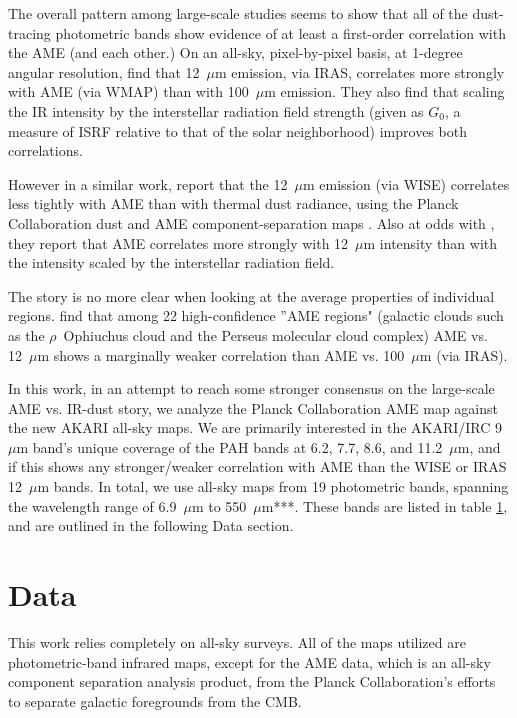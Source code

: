 \documentclass[preprint2,longabstract]{aastex}
\begin{document}
    The overall pattern among large-scale studies seems to show that all of the dust-tracing photometric bands show evidence of at least a first-order correlation with the AME (and each other.) On an all-sky, pixel-by-pixel basis, at 1-degree angular resolution, \cite{ysard10b} find that 12~$\mu$m emission, via IRAS, correlates more strongly with AME (via WMAP) than with 100~$\mu$m emission. They also find that scaling the IR intensity by the interstellar radiation field strength (given as $G_0$, a measure of ISRF relative to that of the solar neighborhood) improves both correlations.
    
    However in a similar work, \cite{hensley16} report that the 12~$\mu$m emission (via WISE) correlates less tightly with AME than with thermal dust radiance, using the Planck Collaboration dust and AME component-separation maps \citep{planck15X}. Also at odds with \cite{ysard10b}, they report that AME correlates more strongly with 12~$\mu$m intensity than with the intensity scaled by the interstellar radiation field.
    
     The story is no more clear when looking at the average properties of individual regions. \cite{planckXV} find that among 22 high-confidence ''AME regions" (galactic clouds such as the $\rho$~Ophiuchus cloud and the Perseus molecular cloud complex) AME vs. 12~$\mu$m  shows a marginally weaker correlation than AME vs. 100~$\mu$m (via IRAS).  
     
     In this work, in an attempt to reach some stronger consensus on the large-scale AME vs. IR-dust story, we analyze the Planck Collaboration AME map against the new AKARI all-sky maps.  We are primarily interested in the AKARI/IRC 9~$\mu$m band's unique coverage of the PAH bands at 6.2, 7.7, 8.6, and 11.2~$\mu$m, and if this shows any stronger/weaker correlation with AME than the WISE or IRAS 12~$\mu$m bands. In total, we use all-sky maps from 19 photometric bands, spanning the wavelength range of 6.9~$\mu$m to 550~$\mu$m***. These bands are listed in table \ref{sec:data}, and are outlined in the following Data section.
   

\section{Data}
\label{sec:data}     

This work relies completely on all-sky surveys. All of the maps utilized are photometric-band infrared maps, except for the AME data, which is an all-sky component separation analysis product, from the Planck Collaboration's efforts to separate galactic foregrounds from the CMB.
\end{document}
